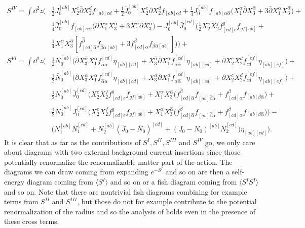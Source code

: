 \documentclass[12pt]{article}
\numberwithin{equation}{section}
\newcommand{\h}[1]{\hat{#1}}
\begin{document}
{\begin{align}
			S^{IV} = \int \dd^2 z \big(&\frac{1}{2} J_0^{[ab]} X_2^c \bar{\partial} X_2^d f_{[ab]cd}  + \frac{1}{2} \bar{J}_0^{[ab]} X_2^c \partial X_2^d f_{[ab]cd} + \frac{1}{4}J_0^{[ab]}   f_{[ab]\alpha \h{\alpha}} \big(X_1^\alpha \bar{\partial} X_3^{\h{\alpha}} + 3\bar{\partial} X_1^\alpha X_3^{\h{\alpha}}\big) + \nonumber \\
						   &\frac{1}{4} \bar{J}_0^{[ab]} f_{[ab]\alpha \h{\alpha}}  \big(\partial X_1^\alpha X_3^{\h{\alpha}} + 3 X_1^\alpha \partial X_3^{\h{\alpha}}\big) - J_0^{[ab]} \bar{J}_0^{[cd]} \big(\frac{1}{2} X_2^e X_2^f f_{[cd] e}^g f_{g f [ab]} + \nonumber \\
						   &\frac{1}{4} X_1^\alpha X_3^{\h{\alpha}} [f_{[cd]\h{\alpha}}^{\h{\beta}} f_{\h{\beta} \alpha [ab]} + 3 f_{[cd] \alpha}^{\beta} f_{\beta \h{\alpha} [ab]}] \big) \big) +  \nonumber \\
			S^{VI} = \int \dd^2 z \big(& \frac{1}{2} N_0^{[ab]} \big(\bar{\partial} X_3^{\h{\alpha}} X_1^\alpha f_{\h{\alpha} \alpha}^{[cd]} \eta_{[ab][cd]} + X_3^{\h{\alpha}} \bar{\partial} X_1^\alpha f_{\alpha \h{\alpha}}^{[cd]} \eta_{[ab][cd]} + \bar{\partial} X_2^c X_2^d f_{cd}^{[ef]} \eta_{[ab][ef]}\big) +\nonumber \\
								 & \frac{1}{2}\bar{N}_0^{[ab]}\big(\partial X_3^{\h{\alpha}} X_1^\alpha f_{\h{\alpha} \alpha}^{[cd]} \eta_{[ab][cd]} + X_3^{\h{\alpha}} \partial X_1^\alpha f_{\alpha \h{\alpha}}^{[cd]} \eta_{[ab][cd]} + \partial X_2^c X_2^d f_{cd}^{[ef]} \eta_{[ab][ef]}\big) +
								 \nonumber \\
								 &\frac{1}{2}N_0^{[ab]}\bar{J}_0^{[cd]} \big(X_2^e X_2^f f_{[cd]e}^g f_{gf[ab]} + X_1^\alpha X_3^{\h{\alpha}}\big(f_{[cd]\h{\alpha}}^{\h{\beta}} f_{[ab]\h{\beta}\alpha} + f_{[cd]\alpha}^\beta f_{[ab]\beta \h{\alpha}}
									\big) + \nonumber \\
								 &\frac{1}{2}\bar{N}_0^{[ab]}J_0^{[cd]} \big(X_2^e X_2^f f_{[cd]e}^g f_{gf[ab]} + X_1^\alpha X_3^{\h{\alpha}}\big(f_{[cd]\h{\alpha}}^{\h{\beta}} f_{[ab]\h{\beta}\alpha} + f_{[cd]\alpha}^\beta f_{[ab]\beta \h{\alpha}}
									\big)\big)- \nonumber \\
								 &\big(N_1^{[ab]} \bar{N}_1^{[cd]} + N_2^{[ab]}(\bar{J}_0-\bar{N}_0)^{[cd]} + (J_0 - N_0)^{[ab]} \bar{N}_2^{[cd]}\big) \eta_{[ab][cd]}\big).
\label{actionComp}
\end{align}
}
It is clear that as far as the contributions of $S^{I}, S^{II}, S^{III}$ and $S^{IV}$ go, we only care about diagrams with two external background current insertions since those potentially renormalize the renormalizable matter part of the action. The diagrams we can draw coming from expanding $e^{-S^I}$ and so on are then a self-energy diagram coming from $\langle S^I \rangle$ and so on or a fish diagram coming from $\langle S^I S^I \rangle$ and so on. Note that there are nontrivial fish diagrams combining for example terms from $S^{II}$ and $S^{III}$, but those do not for example contribute to the potential renormalization of the radius and so the analysis of \cite{Mazzucato:2009fv} holds even in the presence of these cross terms.
\end{document}
